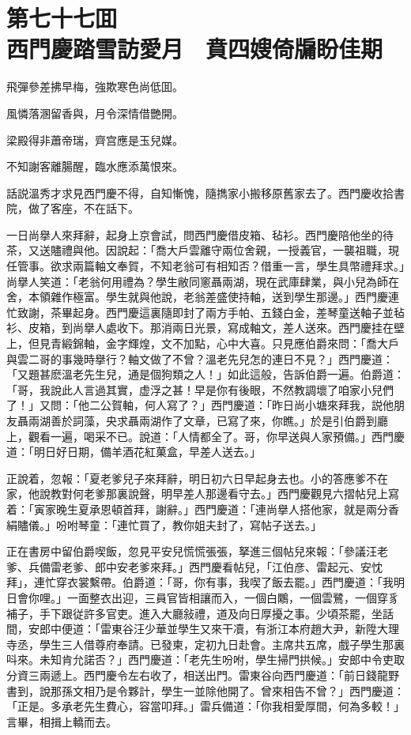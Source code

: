 
\chapter*{第七十七囬　\\西門慶踏雪訪愛月　賁四嫂倚牖盼佳期}


\begin{myquote}
飛彈參差拂早梅，強欺寒色尚低囬。

風憐落溷留香與，月令深情借艷開。

梁殿得非蕭帝瑞，齊宫應是玉兒媒。

不知謝客離腸醒，臨水應添萬恨來。
\end{myquote}

話説溫秀才求見西門慶不得，自知慚愧，隨擕家小搬移原舊家去了。西門慶收拾書院，做了客座，不在話下。

一日尚擧人來拜辭，起身上京會試，問西門慶借皮箱、毡衫。西門慶陪他坐的待茶，又送贐禮與他。因說起：「喬大戶雲離守兩位舍親，一授義官，一襲祖職，現任管事。欲求兩篇軸文奉賀，不知老翁可有相知否？借重一言，學生具幣禮拜求。」尚擧人笑道：「老翁何用禮為？學生敝同窻聶兩湖，現在武庫肆業，與小兒為師在舍，本領雜作極富。學生就與他說，老翁差盛使持軸，送到學生那邊。」西門慶連忙致謝，茶畢起身。西門慶這裏隨即封了兩方手帕、五錢白金，差琴童送軸子並毡衫、皮箱，到尚擧人處收下。那消兩日光景，寫成軸文，差人送來。西門慶挂在壁上，但見青緞錦軸，金字輝煌，文不加點，心中大喜。只見應伯爵來問：「喬大戶與雲二哥的事幾時擧行？軸文做了不曾？溫老先兒怎的連日不見？」西門慶道：「又題甚麽溫老先生兒，通是個狗類之人！」如此這般，告訴伯爵一遍。伯爵道：「哥，我說此人言過其實，虚浮之甚！早是你有後眼，不然教調壞了咱家小兒們了！」又問：「他二公賀軸，何人寫了？」西門慶道：「昨日尚小塘來拜我，説他朋友聶兩湖善於詞藻，央求聶兩湖作了文章，已寫了來，你瞧。」於是引伯爵到廳上，觀看一遍，喝采不已。說道：「人情都全了。哥，你早送與人家預備。」西門慶道：「明日好日期，備羊酒花紅菓盒，早差人送去。」

正說着，忽報：「夏老爹兒子來拜辭，明日初六日早起身去也。小的答應爹不在家，他說教對何老爹那裏說聲，明早差人那邊看守去。」西門慶觀見六摺帖兒上寫着：「寅家晚生夏承恩頓首拜，謝辭。」西門慶道：「連尚擧人搭他家，就是兩分香絹贐儀。」吩咐琴童：「連忙買了，教你姐夫封了，寫帖子送去。」

正在書房中留伯爵喫飯，忽見平安兒慌慌張張，拏進三個帖兒來報：「參議汪老爹、兵備雷老爹、郎中安老爹來拜。」西門慶看帖兒，「江伯彦、雷起元、安忱拜」，連忙穿衣裳繫帶。伯爵道：「哥，你有事，我喫了飯去罷。」西門慶道：「我明日會你哩。」一面整衣出迎，三員官皆相讓而入，一個白鷴，一個雲鷺，一個穿豸補子，手下跟従許多官吏。進入大廳敍禮，道及向日厚擾之事。少頃茶罷，坐話間，安郎中便道：「雷東谷汪少華並學生又來干凟，有浙江本府趙大尹，新陞大理寺丞，學生三人借尊府奉請。已發柬，定初九日赴會。主席共五席，戲子學生那裏呌來。未知肯允諾否？」西門慶道：「老先生吩咐，學生掃門拱候。」安郎中令吏取分資三兩遞上。西門慶令左右收了，相送出門。雷東谷向西門慶道：「前日錢龍野書到，說那孫文相乃是令夥計，學生一並除他開了。曾來相告不曾？」西門慶道：「正是。多承老先生費心，容當叩拜。」雷兵備道：「你我相愛厚間，何為多較！」言畢，相揖上轎而去。

